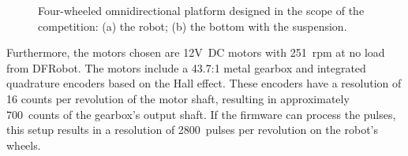 \documentclass[conference]{IEEEtran}
\begin{document}
\begin{figure}[!t]
\centering
{}
\linebreak
{}
\caption{Four-wheeled omnidirectional platform designed in the scope of the competition:
(a) the robot;
(b) the bottom with the suspension.}
\label{fig:robot}
\end{figure}

Furthermore, the motors chosen are 12V~DC motors with 251~rpm at no load from DFRobot.
The motors include a 43.7:1 metal gearbox and integrated quadrature encoders based on the Hall effect.
These encoders have a resolution of 16 counts per revolution of the motor shaft, resulting in approximately 700~counts of the gearbox's output shaft.
If the firmware can process the pulses, this setup results in a resolution of 2800~pulses per revolution on the robot's wheels.
\end{document}
